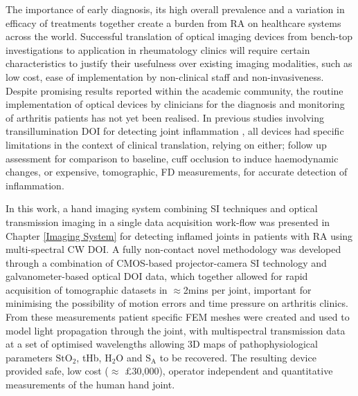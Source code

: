 \documentclass[twoside]{bhamthesis}
\theoremstyle{definition}
\begin{document}
The importance of early diagnosis, its high overall prevalence and a variation in efficacy of treatments together create a burden from RA on healthcare systems across the world. Successful translation of optical imaging devices from bench-top investigations to application in rheumatology clinics will require certain characteristics to justify their usefulness over existing imaging modalities, such as low cost, ease of implementation by non-clinical staff and non-invasiveness. Despite promising results reported within the academic community, the routine implementation of optical devices by clinicians for the diagnosis and monitoring of arthritis patients has not yet been realised. In previous studies involving transillumination DOI for detecting joint inflammation \cite{van2016assessment,hielscher2004sagittal,beuthan2002light,prapavat1995evaluation,prapavat1998evaluation,scheel2003laser}, all devices had specific limitations in the context of clinical translation, relying on either; follow up assessment for comparison to baseline, cuff occlusion to induce haemodynamic changes, or expensive, tomographic, FD measurements, for accurate detection of inflammation.

In this work, a hand imaging system combining SI techniques and optical transmission imaging in a single data acquisition work-flow was presented in Chapter \ref{Imaging System} for  detecting inflamed joints in patients with RA using multi-spectral CW DOI. A fully non-contact novel methodology was developed through a combination of CMOS-based projector-camera SI technology and galvanometer-based optical DOI data, which together allowed for rapid acquisition of tomographic datasets in $\approx$2mins per joint, important for minimising the possibility of motion errors and time pressure on arthritis clinics. From these measurements patient specific FEM meshes were created and used to model light propagation through the joint, with multispectral transmission data at a set of optimised wavelengths allowing 3D maps of pathophysiological parameters $\mathrm{StO_2}$, tHb, $\mathrm{H_2O}$ and $\mathrm{S_A}$ to be recovered. The resulting device provided safe, low cost ($\approx$ $\pounds$30,000), operator independent and quantitative measurements of the human hand joint.
\end{document}
